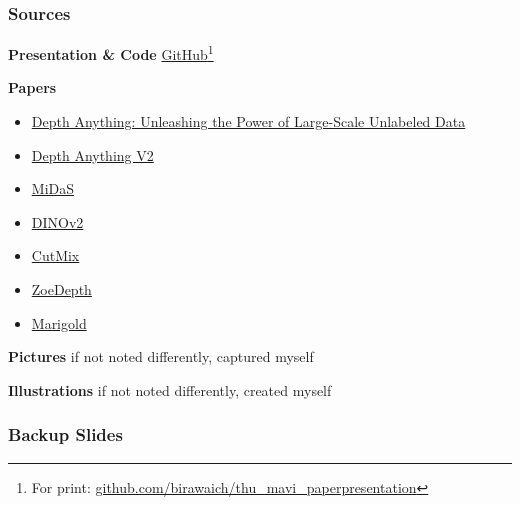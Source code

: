 \documentclass[12pt]{beamer}
\begin{document}
\begin{frame}[noframenumbering]
    \frametitle{Sources}
    \scriptsize
    
    \textbf{Presentation \& Code} \href{https://github.com/birawaich/thu_mavi_paperpresentation}{GitHub}\footnote{ \tiny For print: \url{github.com/birawaich/thu_mavi_paperpresentation}}
    
    \textbf{Papers}
    \begin{itemize}
        \item \href{https://arxiv.org/abs/2401.10891}{Depth Anything: Unleashing the Power of Large-Scale Unlabeled Data}
        \item \href{https://arxiv.org/abs/2406.09414}{Depth Anything V2}
        \item \href{https://arxiv.org/abs/1907.01341}{MiDaS}
        \item \href{https://arxiv.org/abs/2304.07193}{DINOv2}
        \item \href{https://arxiv.org/abs/1905.04899}{CutMix}
        \item \href{https://arxiv.org/abs/2302.12288}{ZoeDepth}
        \item \href{https://arxiv.org/abs/2312.02145}{Marigold}
    \end{itemize}
    
    \textbf{Pictures}
    if not noted differently, captured myself
    
    \textbf{Illustrations}
    if not noted differently, created myself
    
    
\end{frame}

\begin{frame}[noframenumbering]
    \frametitle{Backup Slides}
\end{frame}
\end{document}
